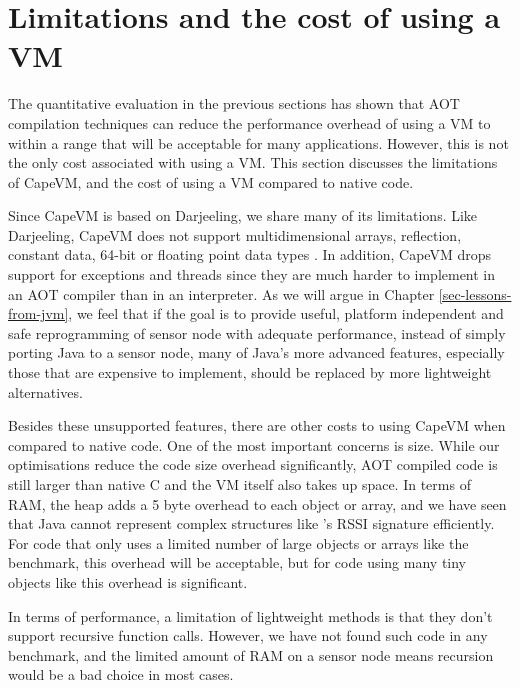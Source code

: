 \section{Limitations and the cost of using a VM}
\label{sec-evaluation-limitations}
The quantitative evaluation in the previous sections has shown that AOT compilation techniques can reduce the performance overhead of using a VM to within a range that will be acceptable for many applications. However, this is not the only cost associated with using a VM. This section discusses the limitations of CapeVM, and the cost of using a VM compared to native code.

Since CapeVM is based on Darjeeling, we share many of its limitations. Like Darjeeling, CapeVM does not support multidimensional arrays, reflection, constant data, 64-bit or floating point data types \cite{Brouwers:2009cj}. In addition, CapeVM drops support for exceptions and threads since they are much harder to implement in an AOT compiler than in an interpreter. As we will argue in Chapter \ref{sec-lessons-from-jvm}, we feel that if the goal is to provide useful, platform independent and safe reprogramming of sensor node with adequate performance, instead of simply porting Java to a sensor node, many of Java's more advanced features, especially those that are expensive to implement, should be replaced by more lightweight alternatives.

Besides these unsupported features, there are other costs to using CapeVM when compared to native code. One of the most important concerns is size. While our optimisations reduce the code size overhead significantly, AOT compiled code is still larger than native C and the VM itself also takes up space. In terms of RAM, the heap adds a 5 byte overhead to each object or array, and we have seen that Java cannot represent complex structures like 's RSSI signature efficiently. For code that only uses a limited number of large objects or arrays like the  benchmark, this overhead will be acceptable, but for code using many tiny objects like  this overhead is significant.

In terms of performance, a limitation of lightweight methods is that they don't support recursive function calls. However, we have not found such code in any benchmark, and the limited amount of RAM on a sensor node means recursion would be a bad choice in most cases.


